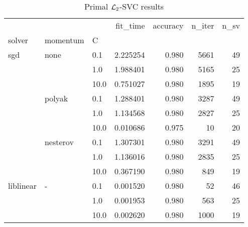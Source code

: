 \begin{table}[H]
\centering
\caption{Primal $\protect \mathcal{L}_2$-SVC results}
\label{primal_l2_svc_cv_results}
\begin{tabular}{lllrrrr}
\toprule
          &   &      &  fit\_time &  accuracy &  n\_iter &  n\_sv \\
solver & momentum & C &           &           &         &       \\
\midrule
sgd & none & 0.1  &  2.225254 &     0.980 &    5661 &    49 \\
          &   & 1.0  &  1.988401 &     0.980 &    5165 &    25 \\
          &   & 10.0 &  0.751027 &     0.980 &    1895 &    19 \\
          & polyak & 0.1  &  1.288401 &     0.980 &    3287 &    49 \\
          &   & 1.0  &  1.134568 &     0.980 &    2827 &    25 \\
          &   & 10.0 &  0.010686 &     0.975 &      10 &    20 \\
          & nesterov & 0.1  &  1.307301 &     0.980 &    3291 &    49 \\
          &   & 1.0  &  1.136016 &     0.980 &    2835 &    25 \\
          &   & 10.0 &  0.367190 &     0.980 &     849 &    19 \\
liblinear & - & 0.1  &  0.001520 &     0.980 &      52 &    46 \\
          &   & 1.0  &  0.001953 &     0.980 &     563 &    25 \\
          &   & 10.0 &  0.002620 &     0.980 &    1000 &    19 \\
\bottomrule
\end{tabular}
\end{table}
